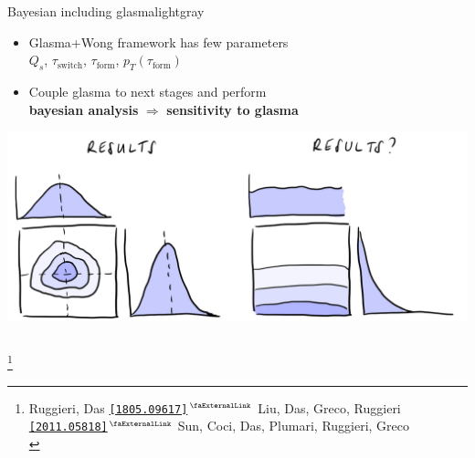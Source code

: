 \documentclass[aspectratio=169,11pt,usenames,dvipsnames]{beamer}
\renewcommand{\thefootnote}{\color{customblue}\faPaperPlaneO}
\newcommand\blfootnote[1]{%
  \begingroup
  \renewcommand\thefootnote{}\footnote{#1}%
  \addtocounter{footnote}{-1}%
  \endgroup
}
\begin{document}
\begin{frame}
\begin{center}
\begin{columns}[onlytextwidth,t]
            \vspace{-10pt}
            \begin{center}
                \begin{custombox2}{\normalsize Bayesian including glasma}{lightgray}
                    \small
                    \begin{varwidth}{0.98\textwidth}
                    \begin{itemize}\itemsep0em 
                        \itemsep0em
                        \footnotesize
                        \item Glasma+Wong framework has few parameters\\
                         $Q_s$, $\tau_\mathrm{switch}$, $\tau_\mathrm{form}$, $p_T(\tau_\mathrm{form})$
                        \item Couple glasma to next stages and perform \\ {\bfseries\color{bayesian}bayesian analysis} $\Rightarrow$ {\bfseries\color{jyured}sensitivity to glasma}
                    \end{itemize}
                    \end{varwidth}
                \end{custombox2}
                \includegraphics[width=\columnwidth]{images/bayesian.png}
            \end{center}
        \end{columns}    
    \end{center}
    \vspace{-10pt}
    \blfootnote{\scriptsize Ruggieri, Das \href{https://arxiv.org/abs/1805.09617}{\color{starrysecond}\texttt{[1805.09617]}$^\text{\scalebox{0.9}{\faExternalLink}}$} Liu, Das, Greco, Ruggieri \href{https://arxiv.org/abs/2011.05818}{\color{starrysecond}\texttt{[2011.05818]}$^\text{\scalebox{0.9}{\faExternalLink}}$} Sun, Coci, Das, Plumari, Ruggieri, Greco \\
}
\end{frame}
\end{document}
